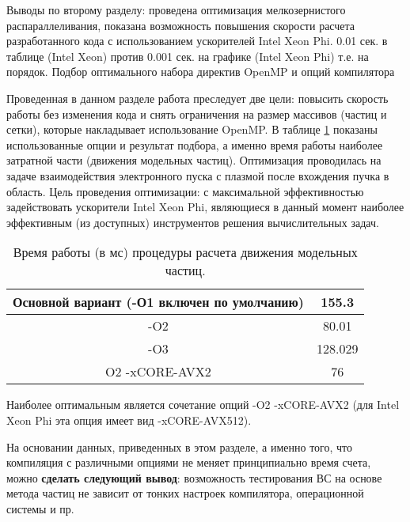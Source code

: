 Выводы по второму разделу: проведена оптимизация мелкозернистого распараллеливания, показана возможность повышения скорости расчета разработанного кода с использованием ускорителей Intel Xeon Phi. 0.01 сек. в таблице (Intel Xeon) против 0.001 сек. на графике (Intel Xeon Phi) т.е. на порядок.
Подбор оптимального набора директив OpenMP и опций компилятора

Проведенная в данном разделе работа преследует две цели: повысить скорость работы без изменения кода и снять ограничения на размер массивов (частиц и сетки), которые накладывает использование OpenMP. В таблице \ref{tabOMPoptions} показаны использованные опции и результат подбора, а именно время работы наиболее затратной части (движения модельных частиц).  Оптимизация проводилась на задаче взаимодействия электронного пуска с плазмой после вхождения пучка в область. Цель проведения оптимизации: с максимальной эффективностью задействовать ускорители Intel Xeon Phi, являющиеся в данный момент наиболее эффективным (из доступных) инструментов решения вычислительных задач.

\begin{center}
\begin{table} [htbp]
\caption{Время работы (в мс) процедуры расчета движения модельных частиц.}\label{tabOMPoptions}%
\begin{tabular}{| c | c |}
\hline
Основной вариант (-О1 включен по умолчанию)   &  155.3 \\ \hline
-O2 &  80.01   \\ \hline
-O3 &  128.029   \\ \hline
O2 -xCORE-AVX2 & 76 \\ 
\hline
\end{tabular}
\end{table}
\end{center}


Наиболее оптимальным является сочетание опций -O2 -xCORE-AVX2 (для Intel Xeon Phi эта опция имеет вид -xCORE-AVX512).

На основании данных, приведенных в этом разделе, а именно того, что компиляция с различными опциями не меняет принципиально время счета, можно \textbf{сделать следующий вывод}: возможность тестирования ВС на основе метода частиц не зависит от тонких настроек компилятора, операционной системы и пр.  

